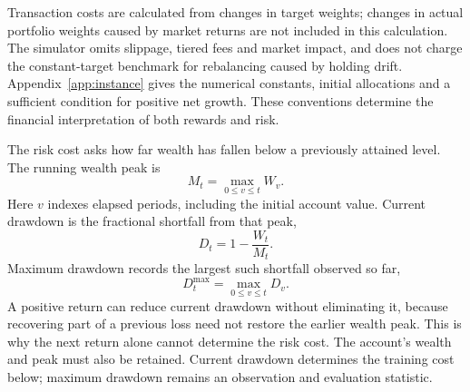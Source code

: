 \documentclass[10pt]{article}
\begin{document}
Transaction costs are calculated from changes in target weights; changes in actual portfolio weights caused by market returns are not included in this calculation. The simulator omits slippage, tiered fees and market impact, and does not charge the constant-target benchmark for rebalancing caused by holding drift. Appendix~\ref{app:instance} gives the numerical constants, initial allocations and a sufficient condition for positive net growth. These conventions determine the financial interpretation of both rewards and risk.

The risk cost asks how far wealth has fallen below a previously attained level. The running wealth peak is
\begin{equation}
  M_t=\max_{0\leq v\leq t}W_v.
  \label{eq:portfolio-peak}
\end{equation}
Here $v$ indexes elapsed periods, including the initial account value. Current drawdown is the fractional shortfall from that peak,
\begin{equation}
  D_t=1-\frac{W_t}{M_t}.
  \label{eq:portfolio-drawdown}
\end{equation}
Maximum drawdown records the largest such shortfall observed so far,
\begin{equation}
  D_t^{\max}=\max_{0\leq v\leq t}D_v.
  \label{eq:portfolio-max-drawdown}
\end{equation}
A positive return can reduce current drawdown without eliminating it, because recovering part of a previous loss need not restore the earlier wealth peak. This is why the next return alone cannot determine the risk cost. The account's wealth and peak must also be retained. Current drawdown determines the training cost below; maximum drawdown remains an observation and evaluation statistic.
\end{document}
